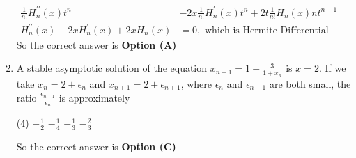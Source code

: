 \begin{enumerate}[label=\color{ocre}\textbf{\arabic*.}]
\begin{answer}
\begin{align*}
		\frac{1}{n !} H_{n}^{\prime \prime}(x) t^{n}&-2 x \frac{1}{n !} H_{n}^{\prime}(x) t^{n}+2 t \frac{1}{n !} H_{n}(x) n t^{n-1}\\
		H_{n}^{\prime \prime}(x)-2 x H_{n}^{\prime}(x)+2 x H_{n}(x)&=0,\text{ which is Hermite Differential Equation.}
		\end{align*}
		So the correct answer is \textbf{Option (A)}
	\end{answer}
	\item A stable asymptotic solution of the equation $x_{n+1}=1+\frac{3}{1+x_{n}}$ is $x=2$. If we take $x_{n}=2+\epsilon_{n}$ and $x_{n+1}=2+\epsilon_{n+1}$, where $\epsilon_{n}$ and $\epsilon_{n+1}$ are both small, the ratio $\frac{\epsilon_{n+1}}{\epsilon_{n}}$ is approximately
	{}
	\begin{tasks}(4)
		\task[\textbf{A.}] $-\frac{1}{2}$
		\task[\textbf{B.}] $-\frac{1}{4}$
		\task[\textbf{C.}]  $-\frac{1}{3}$
		\task[\textbf{D.}] $-\frac{2}{3}$
	\end{tasks}
	\begin{answer}
		So the correct answer is \textbf{Option (C)}
	\end{answer}
	

\end{enumerate}
